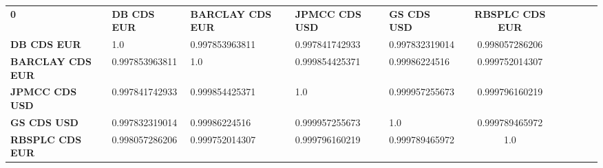 \begin{center}
 \begin{tabular}{|l|l|l|l|l|c|c|c|c|c|}
\hline
\textbf{0} & \textbf{DB CDS EUR} & \textbf{BARCLAY CDS EUR} & \textbf{JPMCC CDS USD} & \textbf{GS CDS USD} & \textbf{RBSPLC CDS EUR}\\\hhline{|=|=|=|=|=|=|}
\textbf{DB CDS EUR} & 1.0 & 0.997853963811 & 0.997841742933 & 0.997832319014 & 0.998057286206\\
\textbf{BARCLAY CDS EUR} & 0.997853963811 & 1.0 & 0.999854425371 & 0.99986224516 & 0.999752014307\\
\textbf{JPMCC CDS USD} & 0.997841742933 & 0.999854425371 & 1.0 & 0.999957255673 & 0.999796160219\\
\textbf{GS CDS USD} & 0.997832319014 & 0.99986224516 & 0.999957255673 & 1.0 & 0.999789465972\\
\textbf{RBSPLC CDS EUR} & 0.998057286206 & 0.999752014307 & 0.999796160219 & 0.999789465972 & 1.0\\
\hline
\end{tabular}
\end{center}